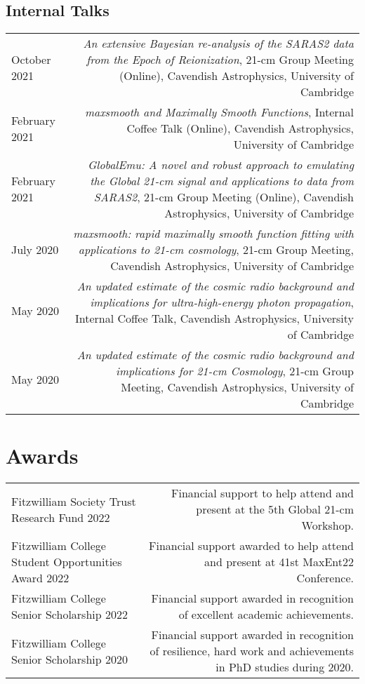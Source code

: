 \documentclass{article}
\begin{document}
\subsection*{Internal Talks}
\begin{tabular}{L!{\vrule}R}
	October 2021 & \textit{An extensive Bayesian re-analysis of the SARAS2 data from the Epoch of Reionization}, 21-cm Group Meeting (Online), Cavendish Astrophysics, University of Cambridge \\
	February 2021 & \textit{maxsmooth and Maximally Smooth Functions}, Internal Coffee Talk (Online), Cavendish Astrophysics, University of Cambridge \\
	February 2021 & \textit{GlobalEmu: A novel and robust approach to emulating the Global 21-cm signal and applications to data from SARAS2}, 21-cm Group Meeting (Online), Cavendish Astrophysics, University of Cambridge \\
	July 2020 & \textit{maxsmooth: rapid maximally smooth function fitting with applications to 21-cm cosmology}, 21-cm Group Meeting, Cavendish Astrophysics, University of Cambridge \\
	May 2020 & \textit{An updated estimate of the cosmic radio background and implications for ultra-high-energy photon propagation}, Internal Coffee Talk, Cavendish Astrophysics, University of Cambridge \\
	May 2020 & \textit{An updated estimate of the cosmic radio background and implications for 21-cm Cosmology}, 21-cm Group Meeting, Cavendish Astrophysics, University of Cambridge
\end{tabular}

\section*{Awards}

\begin{tabular}{l!{\vrule}r}
    Fitzwilliam Society Trust Research Fund 2022 & Financial support to help attend and present at the 5th Global 21-cm Workshop. \\
	Fitzwilliam College Student Opportunities Award 2022 & Financial support awarded to help attend and present at 41st MaxEnt22 Conference. \\
	Fitzwilliam College Senior Scholarship 2022 & Financial support awarded in recognition of excellent academic achievements. \\
	Fitzwilliam College Senior Scholarship 2020 & Financial support awarded in recognition of resilience, hard work and achievements in PhD studies during 2020.
\end{tabular}
\end{document}
